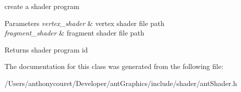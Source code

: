 create a shader program 


\begin{DoxyParams}{Parameters}
{\em vertex\+\_\+shader} & vertex shader file path \\
\hline
{\em fragment\+\_\+shader} & fragment shader file path \\
\hline
\end{DoxyParams}
\begin{DoxyReturn}{Returns}
shader program id 
\end{DoxyReturn}


The documentation for this class was generated from the following file\+:\begin{DoxyCompactItemize}
\item 
/\+Users/anthonycouret/\+Developer/ant\+Graphics/include/shader/ant\+Shader.\+h\end{DoxyCompactItemize}
